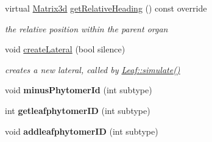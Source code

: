 \begin{DoxyCompactItemize}
\mbox{\label{classCPlantBox_1_1Leaf_a93286071bb116459962e9b0365ed5001}} 
virtual \hyperlink{classCPlantBox_1_1Matrix3d}{Matrix3d} \hyperlink{classCPlantBox_1_1Leaf_a93286071bb116459962e9b0365ed5001}{get\+Relative\+Heading} () const override
\begin{DoxyCompactList}\small\item\em the relative position within the parent organ \end{DoxyCompactList}\item 
void \hyperlink{classCPlantBox_1_1Leaf_a8778214ada72f26a9e9e71dcd8cac087}{create\+Lateral} (bool silence)
\begin{DoxyCompactList}\small\item\em creates a new lateral, called by \hyperlink{classCPlantBox_1_1Leaf_ac8f35a92020107f44059b995e44af5d6}{Leaf\+::simulate()} \end{DoxyCompactList}\item 
\mbox{\label{classCPlantBox_1_1Leaf_ae05cf8384ee6186d728c2c1fe9a7db67}} 
void {\bfseries minus\+Phytomer\+Id} (int subtype)
\item 
\mbox{\label{classCPlantBox_1_1Leaf_acb5adec7a2e5088ca1150c821e765a9e}} 
int {\bfseries getleafphytomer\+ID} (int subtype)
\item 
\mbox{\label{classCPlantBox_1_1Leaf_a5912cafb62d77befff4281f062a62b6c}} 
void {\bfseries addleafphytomer\+ID} (int subtype)
\end{DoxyCompactItemize}

